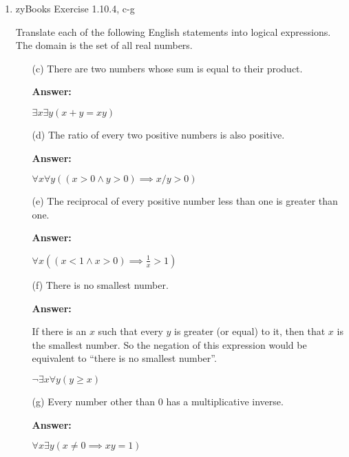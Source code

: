 \documentclass[12pt]{extreport}
\newcommand{\answer}[0]{\medskip \textbf{Answer:} \medskip}
\begin{document}
\begin{enumerate}
    
    \item zyBooks Exercise 1.10.4, c-g
    
    Translate each of the following English statements into logical expressions. The domain is the set of all real numbers.

        \begin{enumerate}
            
            \item[(c)] There are two numbers whose sum is equal to their product.
            
                \answer

                \( \exists x \exists y (x + y = xy) \)

            \item[(d)] The ratio of every two positive numbers is also positive.
            
                \answer 

                \( \forall x \forall y ((x > 0 \land y > 0) \implies x / y > 0) \)

            \item[(e)] The reciprocal of every positive number less than one is greater than one.
            
                \answer

                \( \forall x ((x < 1 \land x > 0) \implies \frac{1}{x} > 1) \)

            \item[(f)] There is no smallest number.
            
                \answer

                If there is an \( x \) such that every \( y \) is greater (or equal) to it, then that \( x \) is the smallest number. So the negation of this expression would be equivalent to ``there is no smallest number''.

                \( \neg \exists x \forall y (y \geq x) \)

            \item[(g)] Every number other than 0 has a multiplicative inverse.
            
                \answer

                \( \forall x \exists y (x \neq 0 \implies xy = 1) \)
            
        \end{enumerate}


\end{enumerate}
\end{document}
